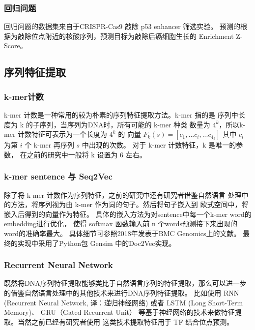 \documentclass[UTF8]{ctexart}
\begin{document}
  \subsubsection{回归问题}
  回归问题的数据集来自于CRISPR-Cas9 敲除 p53 enhancer 筛选实验\autocite{korkmaz2016functional}。
  预测的根据为敲除位点附近的核酸序列，预测目标为敲除后癌细胞生长的 Enrichment Z-Score。

  \subsection{序列特征提取}
  \subsubsection{k-mer计数}
  k-mer 计数是一种常用的较为朴素的序列特征提取方法。k-mer 指的是
  序列中长度为 k 的子序列，当序列为DNA时，所有可能的 k-mer 种类
  数量为 $4^k$，所以k-mer 计数特征可表示为一个长度为 $4^k$ 的
  向量 $F_k(s) = [c_1, ... c_i, ... c_{4_k}] $ 其中 $c_i$ 为第 $i$
  个 k-mer 再序列 $s$ 中出现的次数。 对于 k-mer 计数特征，k 是唯一的参数，
  在之前的研究中一般将 k 设置为 6 左右\autocite{ghandi2014enhanced,zeng2018prediction}。

  \subsubsection{k-mer sentence 与 Seq2Vec}
  除了将 k-mer 计数作为序列特征，之前的研究中还有研究者借鉴自然语言
  处理中的方法，将序列视为由 k-mer 作为词的句子。然后将句子嵌入到
  欧式空间中，将嵌入后得到的向量作为特征\autocite{zeng2018prediction}。
  具体的嵌入方法为对sentence中每一个k-mer word的embedding进行优化，
  使得 softmax 函数输入前 n 个words预测接下来出现的word的准确率最大。
  具体细节可参照2018年发表于BMC Genomics上的文献\autocite{zeng2018prediction}。
  最终的实现中采用了Python包 Gensim\autocite{rehurek_lrec} 中的Doc2Vec实现。

  \subsubsection{Recurrent Neural Network}
  既然将DNA序列特征提取能够类比于自然语言序列的特征提取，那么可以进一步
  的借鉴自然语言处理中的其他技术来进行DNA序列特征提取。
  比如使用 RNN (Recurrent Neural Network, 译：递归神经网络)
  或者 LSTM (Long Short-Term Memory)\autocite{hochreiter1997long}、
  GRU（Gated Recurrent Unit）\autocite{cho2014learning}
  等基于神经网络的技术来做特征提取。当然之前已经有研究者使用
  这类技术提取特征用于 TF 结合位点预测\autocite{shen2018recurrent}。
\end{document}
